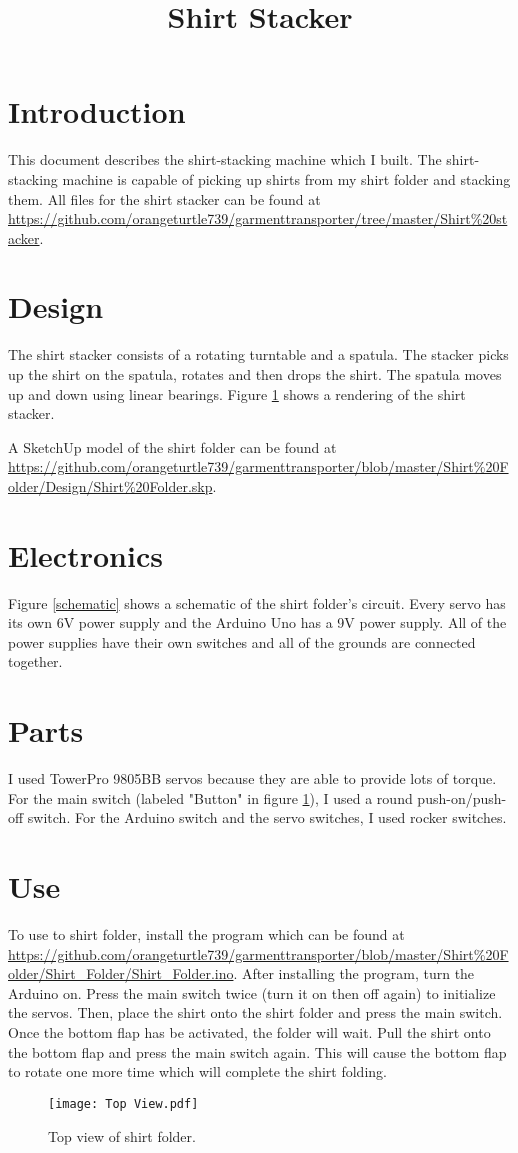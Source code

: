 \documentclass[12pt,letterpaper]{article}
\title{Shirt Stacker}
\author{}
\date{}
\begin{document}
\maketitle
\section{Introduction}
This document describes the shirt-stacking machine which I built. The shirt-stacking machine is capable of picking up shirts from my shirt folder and stacking them. All files for the shirt stacker can be found at \url{https://github.com/orangeturtle739/garmenttransporter/tree/master/Shirt\%20stacker}.

\section{Design}
The shirt stacker consists of a rotating turntable and a spatula. The stacker picks up the shirt on the spatula, rotates and then drops the shirt. The spatula moves up and down using linear bearings. Figure \ref{topview} shows a rendering of the shirt stacker.

A SketchUp model of the shirt folder can be found at \url{https://github.com/orangeturtle739/garmenttransporter/blob/master/Shirt\%20Folder/Design/Shirt\%20Folder.skp}.

\section{Electronics}
Figure \ref{schematic} shows a schematic of the shirt folder's circuit. Every servo has its own 6V power supply and the Arduino Uno has a 9V power supply. All of the power supplies have their own switches and all of the grounds are connected together.

\section{Parts}
I used TowerPro 9805BB servos because they are able to provide lots of torque. For the main switch (labeled "Button" in figure \ref{topview}), I used a round push-on/push-off switch. For the Arduino switch and the servo switches, I used rocker switches.

\section{Use}
To use to shirt folder, install the program which can be found at \url{https://github.com/orangeturtle739/garmenttransporter/blob/master/Shirt\%20Folder/Shirt_Folder/Shirt_Folder.ino}. After installing the program, turn the Arduino on. Press the main switch twice (turn it on then off again) to initialize the servos. Then, place the shirt onto the shirt folder and press the main switch. Once the bottom flap has be activated, the folder will wait. Pull the shirt onto the bottom flap and press the main switch again. This will cause the bottom flap to rotate one more time which will complete the shirt folding.

\begin{figure}[ht]
  \centering
    \texttt{[image: Top View.pdf]}
    \caption{Top view of shirt folder.}
    \label{topview}
\end{figure}
\end{document}

